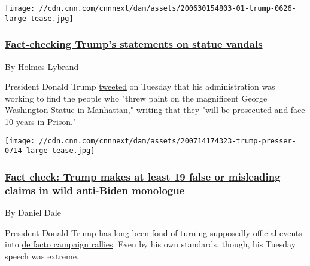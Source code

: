 \href{/2020/06/30/politics/donald-trump-vandals-statues-prison-fact-check/index.html}{}

\texttt{[image: //cdn.cnn.com/cnnnext/dam/assets/200630154803-01-trump-0626-large-tease.jpg]}

\hypertarget{fact-checking-trumps-statements-on-statue-vandals}{%
\subsubsection{\texorpdfstring{\href{/2020/06/30/politics/donald-trump-vandals-statues-prison-fact-check/index.html}{Fact-checking
Trump's statements on statue
vandals}}{Fact-checking Trump's statements on statue vandals}}\label{fact-checking-trumps-statements-on-statue-vandals}}

By Holmes Lybrand

President Donald Trump
\href{https://twitter.com/realDonaldTrump/status/1277954189008744448}{tweeted}
on Tuesday that his administration was working to find the people who
"threw paint on the magnificent George Washington Statue in Manhattan,"
writing that they "will be prosecuted and face 10 years in Prison."

\href{/2020/07/14/politics/fact-check-trump-biden-speech-rose-garden/index.html}{}

\texttt{[image: //cdn.cnn.com/cnnnext/dam/assets/200714174323-trump-presser-0714-large-tease.jpg]}

\hypertarget{fact-check-trump-makes-at-least-19-false-or-misleading-claims-in-wild-anti-biden-monologue-}{%
\subsubsection{\texorpdfstring{\href{/2020/07/14/politics/fact-check-trump-biden-speech-rose-garden/index.html}{Fact
check: Trump makes at least 19 false or misleading claims in wild
anti-Biden monologue
}}{Fact check: Trump makes at least 19 false or misleading claims in wild anti-Biden monologue }}\label{fact-check-trump-makes-at-least-19-false-or-misleading-claims-in-wild-anti-biden-monologue-}}

By Daniel Dale

President Donald Trump has long been fond of turning supposedly official
events into
\href{https://www.cnn.com/2020/03/23/politics/trump-coronavirus-briefings-rallies/index.html}{de
facto campaign rallies}. Even by his own standards, though, his Tuesday
speech was extreme.

\href{/2020/07/03/politics/joe-biden-attacks-donald-trump-on-coronavirus-fact-check/index.html}{}

